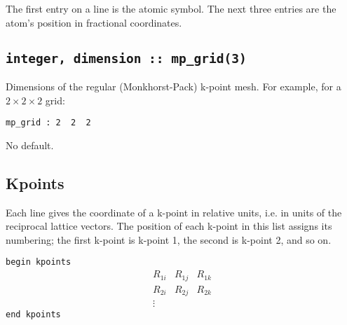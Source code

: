 The first entry on a line is the atomic symbol. The next three entries
are the atom's position in fractional coordinates.


\subsection[mp\_grid]{\tt integer, dimension :: mp\_grid(3)}
Dimensions of the regular (Monkhorst-Pack) k-point mesh. For example,
for a $2\times2\times2$ grid:

\verb#mp_grid : 2  2  2#

No default.


%
%
%
%
%

%

\subsection[Kpoints]{Kpoints}
Each line gives the coordinate of a k-point
in relative units, i.e. in units of the reciprocal lattice
vectors.
The position  of each k-point in this
list assigns its numbering; the first k-point is k-point 1, the second
is k-point 2, and so on.


\noindent \verb#begin kpoints# \\
$$
\begin{array}{ccc}
 R_{1i} & R_{1j} & R_{1k} \\
 R_{2i} & R_{2j} & R_{2k} \\
\vdots
\end{array}
$$
\verb#end kpoints#


